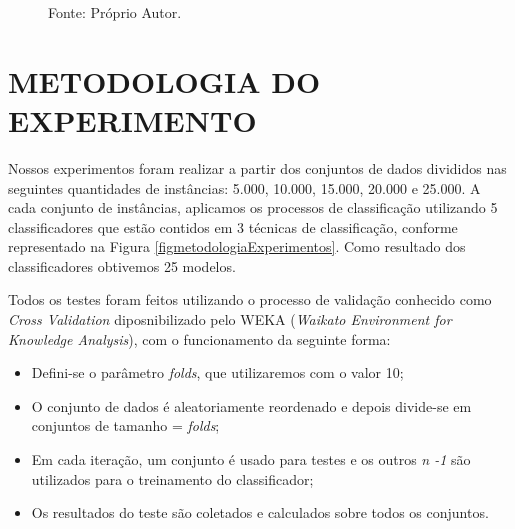 \documentclass[
	12pt,				%
	openright,			%
	oneside,	
	a4paper,				%
	english,				%
	brazil				%
]{abntex2/abntex2} %
\begin{document}
\begin{itemize}
\begin{figure}[!h]
\begin{center}
				\end{center}
			\hspace{4cm} {\fontsize{10}{\baselineskip} \selectfont Fonte: Próprio Autor.}
			\end{figure}
		\end{itemize}

		
	\section{METODOLOGIA DO EXPERIMENTO}
	
	Nossos experimentos foram realizar a partir dos conjuntos de dados divididos nas seguintes quantidades de instâncias: 5.000, 10.000, 15.000, 20.000 e 25.000. A cada conjunto de instâncias, aplicamos os processos de classificação utilizando 5 classificadores que estão contidos em 3 técnicas de classificação, conforme representado na Figura \ref{figmetodologiaExperimentos}. Como resultado dos classificadores obtivemos 25 modelos. 
	
	Todos os testes foram feitos utilizando o processo de validação conhecido como \textit{Cross Validation} diposnibilizado pelo WEKA (\textit{Waikato Environment for Knowledge Analysis}), com o funcionamento da seguinte forma:
	\begin{itemize}
		\item Defini-se o parâmetro \textit{folds}, que utilizaremos com o valor 10;
		\item O conjunto de dados é aleatoriamente reordenado e depois divide-se em conjuntos de tamanho = \textit{folds};
		\item Em cada iteração, um conjunto é usado para testes e os outros \textit{n -1} são utilizados para o treinamento do classificador;
		\item Os resultados do teste são coletados e calculados sobre todos os conjuntos.
	\end{itemize}
	 
\end{document}
